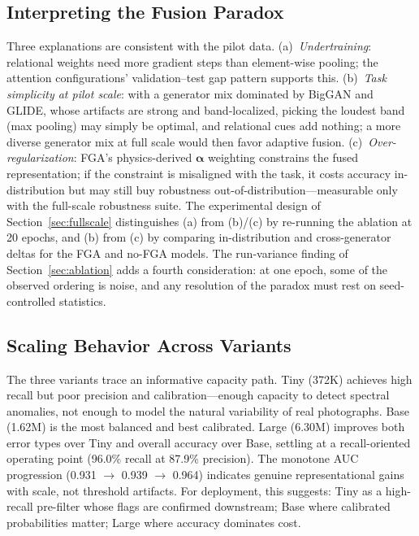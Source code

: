 \documentclass[journal]{IEEEtran}
\begin{document}
\subsection{Interpreting the Fusion Paradox}
Three explanations are consistent with the pilot data. (a)~\emph{Undertraining}: relational weights need more gradient steps than element-wise pooling; the attention configurations' validation--test gap pattern supports this. (b)~\emph{Task simplicity at pilot scale}: with a generator mix dominated by BigGAN and GLIDE, whose artifacts are strong and band-localized, picking the loudest band (max pooling) may simply be optimal, and relational cues add nothing; a more diverse generator mix at full scale would then favor adaptive fusion. (c)~\emph{Over-regularization}: FGA's physics-derived $\boldsymbol{\alpha}$ weighting constrains the fused representation; if the constraint is misaligned with the task, it costs accuracy in-distribution but may still buy robustness out-of-distribution---measurable only with the full-scale robustness suite. The experimental design of Section~\ref{sec:fullscale} distinguishes (a) from (b)/(c) by re-running the ablation at 20 epochs, and (b) from (c) by comparing in-distribution and cross-generator deltas for the FGA and no-FGA models. The run-variance finding of Section~\ref{sec:ablation} adds a fourth consideration: at one epoch, some of the observed ordering is noise, and any resolution of the paradox must rest on seed-controlled statistics.

\subsection{Scaling Behavior Across Variants}
The three variants trace an informative capacity path. Tiny (372K) achieves high recall but poor precision and calibration---enough capacity to detect spectral anomalies, not enough to model the natural variability of real photographs. Base (1.62M) is the most balanced and best calibrated. Large (6.30M) improves both error types over Tiny and overall accuracy over Base, settling at a recall-oriented operating point (96.0\% recall at 87.9\% precision). The monotone AUC progression (0.931 $\rightarrow$ 0.939 $\rightarrow$ 0.964) indicates genuine representational gains with scale, not threshold artifacts. For deployment, this suggests: Tiny as a high-recall pre-filter whose flags are confirmed downstream; Base where calibrated probabilities matter; Large where accuracy dominates cost.
\end{document}
